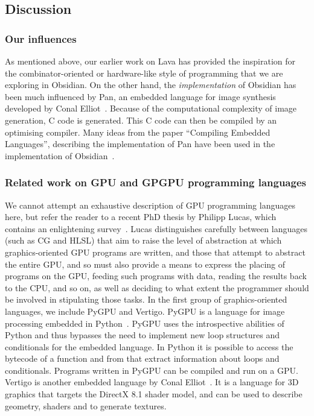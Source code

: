 
\subsection{Discussion} \label{sec:disc}
\subsubsection{Our influences}
As mentioned above, our earlier work on Lava has provided the inspiration for
the combinator-oriented or hardware-like style of programming that we are exploring in Obsidian.
On the other hand, the {\em implementation} of Obsidian has been much influenced by
{Pan}, an embedded language for image synthesis developed by 
Conal Elliot~\cite{PAN}. Because of the computational complexity of image generation, C 
code is generated. This C code can then be compiled by an optimising compiler. 
Many ideas from the paper 
``Compiling Embedded Languages'', describing the implementation of Pan have been 
used in the implementation of Obsidian~\cite{COMPILEEDSL}. 

\subsubsection{Related work on GPU and GPGPU programming languages}
We cannot attempt an exhaustive description of GPU programming languages here, but refer the reader to a recent PhD thesis by Philipp Lucas, which contains an enlightening survey~\cite{Lucas08}. Lucas distinguishes carefully between languages (such as CG and HLSL) that aim to raise the level of abstraction at which graphics-oriented GPU programs are written, and those that attempt to abstract the entire GPU, and so must also provide a means to express the placing of programs on the GPU, feeding such programs with data, reading the results back to the CPU, and so on, as well as deciding to what extent the programmer should be involved
in stipulating those tasks.
In the first group of graphics-oriented languages, we include PyGPU and Vertigo.
PyGPU is a language for image processing embedded in Python~\cite{PyGPU}. 
PyGPU uses the introspective abilities of Python and thus bypasses
the need to implement new loop structures and conditionals for the embedded 
language. In Python it is possible to access the bytecode of a function and 
from that extract information about loops and conditionals. 
Programs written in PyGPU can be compiled and run on a GPU. 
Vertigo is another embedded language by Conal Elliot~\cite{VERTIGO}. It
is a language for 3D graphics that targets the DirectX 8.1 shader model, and
can be used to describe geometry, shaders and to generate textures. 

